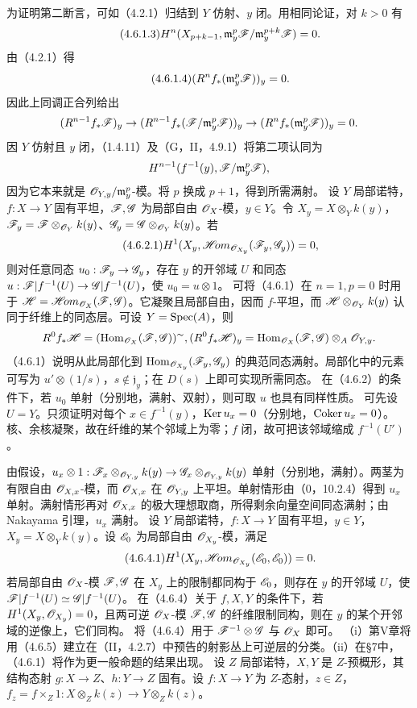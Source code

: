 为证明第二断言，可如（4.2.1）归结到 $Y$ 仿射、$y$ 闭。用相同论证，对 $k>0$ 有
\begin{equation}\tag{4.6.1.3}
H^n(X_{p+k-1},\mathfrak m_y^p\mathscr F/\mathfrak m_y^{p+k}\mathscr F)=0.
\end{equation}
由（4.2.1）得
\begin{equation}\tag{4.6.1.4}(R^nf_*(\mathfrak m_y^p\mathscr F))_y=0.\end{equation}
因此上同调正合列给出
\[
(R^{n-1}f_*\mathscr F)_y\to(R^{n-1}f_*(\mathscr F/\mathfrak m_y^p\mathscr F))_y
\to(R^nf_*(\mathfrak m_y^p\mathscr F))_y=0.
\]
因 $Y$ 仿射且 $y$ 闭，（1.4.11）及（G，II，4.9.1）将第二项认同为
\[
H^{n-1}(f^{-1}(y),\mathscr F/\mathfrak m_y^p\mathscr F),
\]
因为它本来就是 $\mathscr O_{Y,y}/\mathfrak m_y^p$-模。将 $p$ 换成 $p+1$，得到所需满射。\finishproof
{}
设 $Y$ 局部诺特，$f:X\to Y$ 固有平坦，$\mathscr F,\mathscr G$ 为局部自由 $\mathscr O_X$-模，$y\in Y$。令 $X_y=X\otimes_Yk(y)$，$\mathscr F_y=\mathscr F\otimes_{\mathscr O_Y}k(y)$、$\mathscr G_y=\mathscr G\otimes_{\mathscr O_Y}k(y)$。若
\begin{equation}\tag{4.6.2.1}H^1(X_y,\mathscr{H}\!om_{\mathscr O_{X_y}}(\mathscr F_y,\mathscr G_y))=0,\end{equation}
则对任意同态 $u_0:\mathscr F_y\to\mathscr G_y$，存在 $y$ 的开邻域 $U$ 和同态 $u:\mathscr F|f^{-1}(U)\to\mathscr G|f^{-1}(U)$，使 $u_0=u\otimes1$。
\eproof
可将（4.6.1）在 $n=1,p=0$ 时用于 $\mathscr H=\mathscr{H}\!om_{\mathscr O_X}(\mathscr F,\mathscr G)$。它凝聚且局部自由，因而 $f$-平坦，而 $\mathscr H\otimes_{\mathscr O_Y}k(y)$ 认同于纤维上的同态层。可设 $Y=\operatorname{Spec}(A)$，则
\[
R^0f_*\mathscr H=(\operatorname{Hom}_{\mathscr O_X}(\mathscr F,\mathscr G))^\sim,
(R^0f_*\mathscr H)_y=\operatorname{Hom}_{\mathscr O_X}(\mathscr F,\mathscr G)\otimes_A\mathscr O_{Y,y}.
\]
（4.6.1）说明从此局部化到 $\operatorname{Hom}_{\mathscr O_{X_y}}(\mathscr F_y,\mathscr G_y)$ 的典范同态满射。局部化中的元素可写为 $u'\otimes(1/s)$，$s\notin\mathfrak j_y$；在 $D(s)$ 上即可实现所需同态。\finishproof
{}
在（4.6.2）的条件下，若 $u_0$ 单射（分别地，满射、双射），则可取 $u$ 也具有同样性质。
\eproof
可先设 $U=Y$。只须证明对每个 $x\in f^{-1}(y)$，$\operatorname{Ker} u_x=0$（分别地，$\operatorname{Coker} u_x=0$）。核、余核凝聚，故在纤维的某个邻域上为零；$f$ 闭，故可把该邻域缩成 $f^{-1}(U')$。

由假设，$u_x\otimes1:\mathscr F_x\otimes_{\mathscr O_{Y,y}}k(y)\to\mathscr G_x\otimes_{\mathscr O_{Y,y}}k(y)$ 单射（分别地，满射）。两茎为有限自由 $\mathscr O_{X,x}$-模，而 $\mathscr O_{X,x}$ 在 $\mathscr O_{Y,y}$ 上平坦。单射情形由（0，10.2.4）得到 $u_x$ 单射。满射情形再对 $\mathscr O_{X,x}$ 的极大理想取商，所得剩余向量空间同态满射；由 Nakayama 引理，$u_x$ 满射。\finishproof
{}
设 $Y$ 局部诺特，$f:X\to Y$ 固有平坦，$y\in Y$，$X_y=X\otimes_Yk(y)$。设 $\mathscr E_0$ 为局部自由 $\mathscr O_{X_y}$-模，满足
\begin{equation}\tag{4.6.4.1}H^1(X_y,\mathscr{H}\!om_{\mathscr O_{X_y}}(\mathscr E_0,\mathscr E_0))=0.\end{equation}
若局部自由 $\mathscr O_X$-模 $\mathscr F,\mathscr G$ 在 $X_y$ 上的限制都同构于 $\mathscr E_0$，则存在 $y$ 的开邻域 $U$，使 $\mathscr F|f^{-1}(U)\simeq\mathscr G|f^{-1}(U)$。
在（4.6.4）关于 $f,X,Y$ 的条件下，若 $H^1(X_y,\mathscr O_{X_y})=0$，且两可逆 $\mathscr O_X$-模 $\mathscr F,\mathscr G$ 的纤维限制同构，则在 $y$ 的某个开邻域的逆像上，它们同构。
\eproof
将（4.6.4）用于 $\mathscr F^{-1}\otimes\mathscr G$ 与 $\mathscr O_X$ 即可。\finishproof
{}
（i）第V章将用（4.6.5）建立在（II，4.2.7）中预告的射影丛上可逆层的分类。（ii）在§7中，（4.6.1）将作为更一般命题的结果出现。
设 $Z$ 局部诺特，$X,Y$ 是 $Z$-预概形，其结构态射 $g:X\to Z$、$h:Y\to Z$ 固有。设 $f:X\to Y$ 为 $Z$-态射，$z\in Z$，$f_z=f\times_Z1:X\otimes_Zk(z)\to Y\otimes_Zk(z)$。


